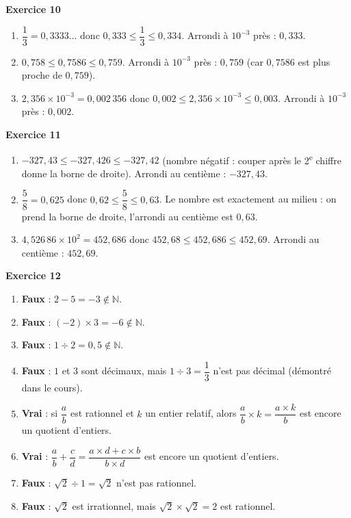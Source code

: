 \documentclass[a4paper,11pt]{article}
\newenvironment{exercice}[1]{%
  \Needspace{6\baselineskip}\par\bigskip\noindent\textbf{Exercice #1}\par\smallskip\noindent\ignorespaces
}{%
  \par
}
\begin{document}
\begin{exercice}{10}
\begin{enumerate}[label=\arabic*.]
\item $\dfrac{1}{3}=0{,}3333\ldots$ donc $0{,}333\leq\dfrac{1}{3}\leq 0{,}334$. Arrondi à $10^{-3}$ près : $0{,}333$.
\item $0{,}758\leq 0{,}7586\leq 0{,}759$. Arrondi à $10^{-3}$ près : $0{,}759$ (car $0{,}7586$ est plus proche de $0{,}759$).
\item $2{,}356\times10^{-3}=0{,}002\,356$ donc $0{,}002\leq 2{,}356\times10^{-3}\leq 0{,}003$. Arrondi à $10^{-3}$ près : $0{,}002$.
\end{enumerate}
\end{exercice}

\begin{exercice}{11}
\begin{enumerate}[label=\arabic*.]
\item $-327{,}43\leq -327{,}426\leq -327{,}42$ (nombre négatif : couper après le 2\textsuperscript{e} chiffre donne la borne de droite). Arrondi au centième : $-327{,}43$.
\item $\dfrac{5}{8}=0{,}625$ donc $0{,}62\leq\dfrac{5}{8}\leq 0{,}63$. Le nombre est exactement au milieu : on prend la borne de droite, l'arrondi au centième est $0{,}63$.
\item $4{,}526\,86\times10^{2}=452{,}686$ donc $452{,}68\leq 452{,}686\leq 452{,}69$. Arrondi au centième : $452{,}69$.
\end{enumerate}
\end{exercice}

\begin{exercice}{12}
\begin{enumerate}[label=\arabic*.]
\item \textbf{Faux} : $2-5=-3\notin\mathbb{N}$.
\item \textbf{Faux} : $(-2)\times 3=-6\notin\mathbb{N}$.
\item \textbf{Faux} : $1\div 2=0{,}5\notin\mathbb{N}$.
\item \textbf{Faux} : $1$ et $3$ sont décimaux, mais $1\div 3=\dfrac{1}{3}$ n'est pas décimal (démontré dans le cours).
\item \textbf{Vrai} : si $\dfrac{a}{b}$ est rationnel et $k$ un entier relatif, alors $\dfrac{a}{b}\times k=\dfrac{a\times k}{b}$ est encore un quotient d'entiers.
\item \textbf{Vrai} : $\dfrac{a}{b}+\dfrac{c}{d}=\dfrac{a\times d+c\times b}{b\times d}$ est encore un quotient d'entiers.
\item \textbf{Faux} : $\sqrt{2}\div 1=\sqrt{2}$ n'est pas rationnel.
\item \textbf{Faux} : $\sqrt{2}$ est irrationnel, mais $\sqrt{2}\times\sqrt{2}=2$ est rationnel.
\end{enumerate}
\end{exercice}
\end{document}
